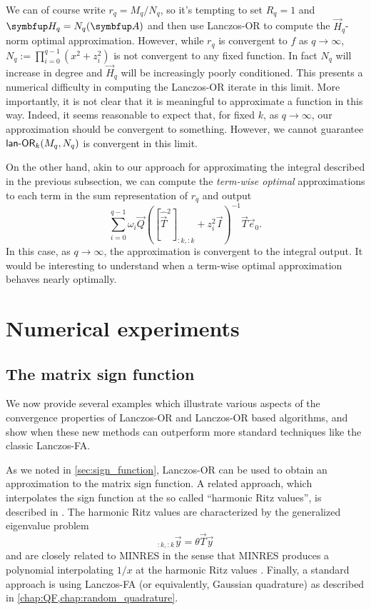We can of course write $r_q = M_q / N_q$, so it's tempting to set $R_q = 1$ and $\vec{H}_q = N_q\A$ and then use Lanczos-OR to compute the $\vec{H}_q$-norm optimal approximation. 
However, while $r_q$ is convergent to $f$ as $q\to\infty$, $N_q := \prod_{i=0}^{q-1} (x^2
+ z_i^2 )$ is not convergent to any fixed function.
In fact $N_q$ will increase in degree and $\vec{H}_q$ will be increasingly poorly conditioned.
This presents a numerical difficulty in computing the Lanczos-OR iterate in this limit.
More importantly, it is not clear that it is meaningful to approximate a function in this way. 
Indeed, it seems reasonable to expect that, for fixed $k$, as $q\to\infty$,  our approximation should be convergent to something. 
However, we cannot guarantee $\textup{\textsf{lan-OR}}_k(M_q,N_q)$ is convergent in this limit.

On the other hand, akin to our approach for approximating the integral described in the previous subsection, we can compute the \emph{term-wise optimal} approximations to each term in the sum representation of $r_q$ and output
\begin{equation*}
    \sum_{i=0}^{q-1} \omega_i \vec{Q} ([\widehat{\vec{T}}^2]_{:k,:k} + z_i^2\vec{I})^{-1} \vec{T} \vec{e}_0.
\end{equation*}
In this case, as $q\to\infty$, the approximation is convergent to the integral output. 
It would be interesting to understand when a term-wise optimal approximation behaves nearly optimally.


\section{Numerical experiments}
\label{sec:comparison}


\subsection{The matrix sign function}

We now provide several examples which illustrate various aspects of the convergence properties of Lanczos-OR and Lanczos-OR based algorithms, and show when these new methods can outperform more standard techniques like the classic Lanczos-FA.

As we noted in \cref{sec:sign_function}, Lanczos-OR can be used to obtain an approximation to the matrix sign function. 
A related approach, which interpolates the sign function at the so called ``harmonic Ritz values'', is described in \cite[Section 4.3]{eshof_frommer_lippert_schilling_van_der_vorst_02}.
The harmonic Ritz values are characterized by the generalized eigenvalue problem
\begin{equation*}
     [\widehat{\vec{T}}^2]_{:k,:k} \vec{y} = \theta \vec{T} \vec{y}
\end{equation*}
and are closely related to MINRES in the sense that MINRES produces a polynomial interpolating $1/x$ at the harmonic Ritz values \cite{paige_parlett_vandervorst_95}.
Finally, a standard approach is using Lanczos-FA (or equivalently, Gaussian quadrature) as described in \cref{chap:QF,chap:random_quadrature}.


